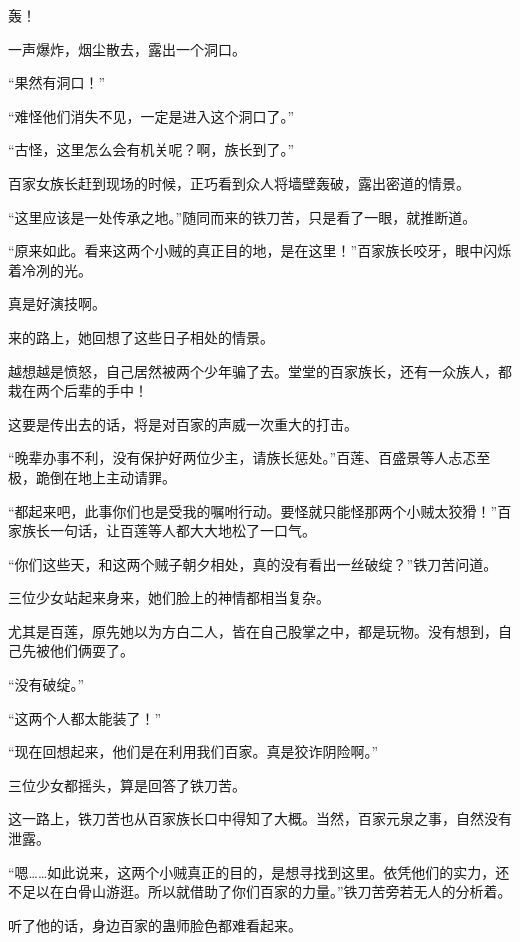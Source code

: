 
\begin{this_body}



轰！

一声爆炸，烟尘散去，露出一个洞口。

“果然有洞口！”

“难怪他们消失不见，一定是进入这个洞口了。”

“古怪，这里怎么会有机关呢？啊，族长到了。”

百家女族长赶到现场的时候，正巧看到众人将墙壁轰破，露出密道的情景。

“这里应该是一处传承之地。”随同而来的铁刀苦，只是看了一眼，就推断道。

“原来如此。看来这两个小贼的真正目的地，是在这里！”百家族长咬牙，眼中闪烁着冷冽的光。

真是好演技啊。

来的路上，她回想了这些日子相处的情景。

越想越是愤怒，自己居然被两个少年骗了去。堂堂的百家族长，还有一众族人，都栽在两个后辈的手中！

这要是传出去的话，将是对百家的声威一次重大的打击。

“晚辈办事不利，没有保护好两位少主，请族长惩处。”百莲、百盛景等人忐忑至极，跪倒在地上主动请罪。

“都起来吧，此事你们也是受我的嘱咐行动。要怪就只能怪那两个小贼太狡猾！”百家族长一句话，让百莲等人都大大地松了一口气。

“你们这些天，和这两个贼子朝夕相处，真的没有看出一丝破绽？”铁刀苦问道。

三位少女站起来身来，她们脸上的神情都相当复杂。

尤其是百莲，原先她以为方白二人，皆在自己股掌之中，都是玩物。没有想到，自己先被他们俩耍了。

“没有破绽。”

“这两个人都太能装了！”

“现在回想起来，他们是在利用我们百家。真是狡诈阴险啊。”

三位少女都摇头，算是回答了铁刀苦。

这一路上，铁刀苦也从百家族长口中得知了大概。当然，百家元泉之事，自然没有泄露。

“嗯……如此说来，这两个小贼真正的目的，是想寻找到这里。依凭他们的实力，还不足以在白骨山游逛。所以就借助了你们百家的力量。”铁刀苦旁若无人的分析着。

听了他的话，身边百家的蛊师脸色都难看起来。


\end{this_body}
